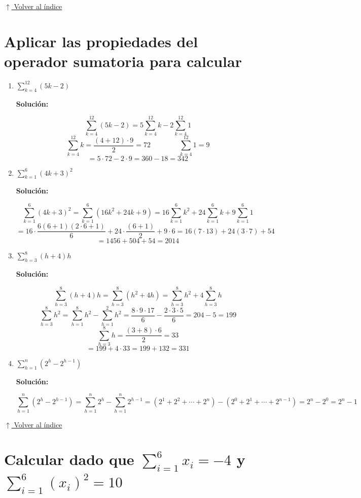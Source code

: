 \documentclass[12pt]{article}
\newcommand{\solucion}{%
    \vspace{0.8em}%
    \textbf{Solución:}%
}
\newcommand{\volverindice}{%
    \vspace{1em}%
    \begin{flushright}%
        \hyperlink{indice}{\small $\uparrow$ Volver al índice}%
    \end{flushright}%
}
\begin{document}
\volverindice

\section{Aplicar las propiedades del operador sumatoria para calcular}

\begin{enumerate}[label=\alph*.-]
    \item $\displaystyle\sum_{k=4}^{12}(5k-2)$

    \solucion
    \[
    \sum_{k=4}^{12}(5k-2) = 5\sum_{k=4}^{12}k - 2\sum_{k=4}^{12}1
    \]
    \[
    \sum_{k=4}^{12}k = \frac{(4+12)\cdot9}{2} = 72
    \qquad\qquad
    \sum_{k=4}^{12}1 = 9
    \]
    \[
    = 5\cdot72 - 2\cdot9 = 360 - 18 = 342
    \]

    \item $\displaystyle\sum_{k=1}^{6}(4k+3)^2$

    \solucion
    \[
    \sum_{k=1}^{6}(4k+3)^2 = \sum_{k=1}^{6}(16k^2+24k+9)
    = 16\sum_{k=1}^{6}k^2 + 24\sum_{k=1}^{6}k + 9\sum_{k=1}^{6}1
    \]
    \[
    = 16\cdot\frac{6(6+1)(2\cdot6+1)}{6} + 24\cdot\frac{(6+1)}{2} + 9\cdot6
    = 16(7\cdot13) + 24(3\cdot7) + 54
    \]
    \[
    = 1456 + 504 + 54 = 2014
    \]

    \item $\displaystyle\sum_{h=3}^{8}(h+4)h$

    \solucion
    \[
    \sum_{h=3}^{8}(h+4)h = \sum_{h=3}^{8}(h^2+4h)
    = \sum_{h=3}^{8}h^2 + 4\sum_{h=3}^{8}h
    \]
    \[
    \sum_{h=3}^{8}h^2
    = \sum_{h=1}^{8}h^2 - \sum_{h=1}^{2}h^2
    = \frac{8\cdot9\cdot17}{6} - \frac{2\cdot3\cdot5}{6}
    = 204 - 5 = 199
    \]
    \[
    \sum_{h=3}^{8}h
    = \frac{(3+8)\cdot6}{2} = 33
    \]
    \[
    = 199 + 4\cdot33 = 199 + 132 = 331
    \]

    \item $\displaystyle\sum_{h=1}^{n}(2^h - 2^{h-1})$

    \solucion
    \[
    \sum_{h=1}^{n}(2^h - 2^{h-1}) = \sum_{h=1}^{n}2^h - \sum_{h=1}^{n}2^{h-1}
    = (2^1+2^2+\cdots+2^n) - (2^0+2^1+\cdots+2^{n-1})
    = 2^n - 2^0 = 2^n - 1
    \]

\end{enumerate}

\volverindice


\section{Calcular dado que $\sum_{i=1}^{6} x_i = -4$ y $\sum_{i=1}^{6}(x_i)^2 = 10$}
\end{document}
